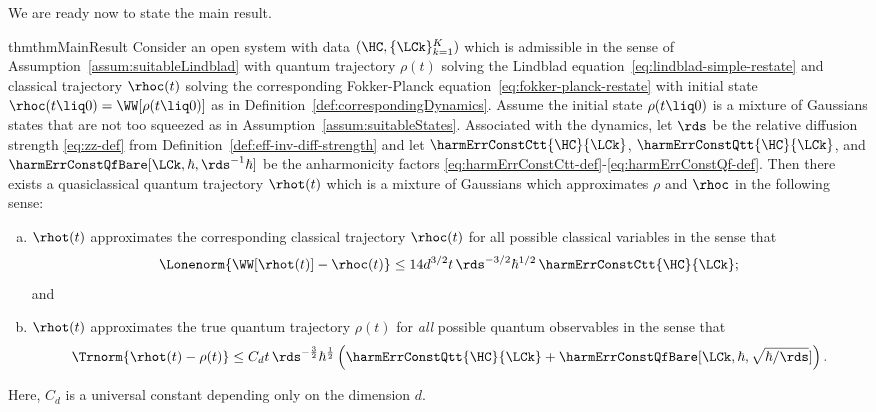 \documentclass{article}
\numberwithin{equation}{section}
\begin{document}
We are ready now to state the main result.
\begin{restatable}{thm}{thmMainResult}
\label{thm:mainResult}
    Consider an open system with data $(\HC,\{\LCk\}_{k=1}^K)$ which is admissible in the sense of Assumption~\ref{assum:suitableLindblad} with quantum trajectory $\rho(t)$ solving the Lindblad equation~\eqref{eq:lindblad-simple-restate} and classical trajectory $\rhoc(t)$ solving the corresponding Fokker-Planck equation~\eqref{eq:fokker-planck-restate} with initial state $\rhoc(t\liq 0) = \WW[\rho(t\liq 0)]$ as in Definition~\ref{def:correspondingDynamics}.  Assume the initial state $\rho(t\liq 0)$ is a mixture of Gaussians states that are not too squeezed as in Assumption~\ref{assum:suitableStates}.
    Associated with the dynamics, let $\rds$ be the relative diffusion strength \eqref{eq:zz-def} from Definition~\ref{def:eff-inv-diff-strength} and let  $\harmErrConstCtt{\HC}{\LCk}$,
    $\harmErrConstQtt{\HC}{\LCk}$, and $\harmErrConstQfBare[\LCk,\hbar,\rds^{-1}\hbar]$ be the anharmonicity factors \eqref{eq:harmErrConstCtt-def}-\eqref{eq:harmErrConstQf-def}.
    Then there exists a quasiclassical quantum trajectory $\rhot(t)$ which is a 
    mixture of Gaussians which approximates $\rho$ and $\rhoc$ in the following sense:
    \begin{enumerate}[a.]
        \item \label{item:classical-error-main}
        $\rhot(t)$ approximates the corresponding classical trajectory $\rhoc(t)$ for all possible classical variables in the sense that 
        \begin{equation}\label{eq:main-classical}
            \Lonenorm{\WW[\rhot(t)]-\rhoc(t)} \le 
            14 d^{3/2}t\, 
            \rds^{-3/2}\hbar^{1/2}\,
            \harmErrConstCtt{\HC}{\LCk};
        \end{equation}
        and
        \item \label{item:quantum-error-main}
        $\rhot(t)$ approximates the true quantum trajectory $\rho(t)$ for \emph{all} possible quantum observables in the sense that
        \begin{align}\label{eq:main-quantum}
            \Trnorm{\rhot(t)-\rho(t)} \le  C_d
            t \,\rds^{-\frac32} \hbar^{\frac12}
            \left( \harmErrConstQtt{\HC}{\LCk}+
            \harmErrConstQfBare[\LCk,\hbar,\sqrt{\hbar/\rds}]
            \right).
        \end{align}
    \end{enumerate}
    Here, $C_d$ is a universal constant depending only on the dimension $d$.
\end{restatable}
\end{document}
